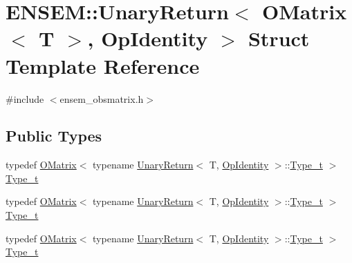 \hypertarget{structENSEM_1_1UnaryReturn_3_01OMatrix_3_01T_01_4_00_01OpIdentity_01_4}{}\section{E\+N\+S\+EM\+:\+:Unary\+Return$<$ O\+Matrix$<$ T $>$, Op\+Identity $>$ Struct Template Reference}
\label{structENSEM_1_1UnaryReturn_3_01OMatrix_3_01T_01_4_00_01OpIdentity_01_4}


{\ttfamily \#include $<$ensem\+\_\+obsmatrix.\+h$>$}

\subsection*{Public Types}
\begin{DoxyCompactItemize}
\item 
typedef \mbox{\hyperlink{classENSEM_1_1OMatrix}{O\+Matrix}}$<$ typename \mbox{\hyperlink{structENSEM_1_1UnaryReturn}{Unary\+Return}}$<$ T, \mbox{\hyperlink{structENSEM_1_1OpIdentity}{Op\+Identity}} $>$\+::\mbox{\hyperlink{structENSEM_1_1UnaryReturn_3_01OMatrix_3_01T_01_4_00_01OpIdentity_01_4_a7f4dcdf040c4857ee984e5fbf4813fc6}{Type\+\_\+t}} $>$ \mbox{\hyperlink{structENSEM_1_1UnaryReturn_3_01OMatrix_3_01T_01_4_00_01OpIdentity_01_4_a7f4dcdf040c4857ee984e5fbf4813fc6}{Type\+\_\+t}}
\item 
typedef \mbox{\hyperlink{classENSEM_1_1OMatrix}{O\+Matrix}}$<$ typename \mbox{\hyperlink{structENSEM_1_1UnaryReturn}{Unary\+Return}}$<$ T, \mbox{\hyperlink{structENSEM_1_1OpIdentity}{Op\+Identity}} $>$\+::\mbox{\hyperlink{structENSEM_1_1UnaryReturn_3_01OMatrix_3_01T_01_4_00_01OpIdentity_01_4_a7f4dcdf040c4857ee984e5fbf4813fc6}{Type\+\_\+t}} $>$ \mbox{\hyperlink{structENSEM_1_1UnaryReturn_3_01OMatrix_3_01T_01_4_00_01OpIdentity_01_4_a7f4dcdf040c4857ee984e5fbf4813fc6}{Type\+\_\+t}}
\item 
typedef \mbox{\hyperlink{classENSEM_1_1OMatrix}{O\+Matrix}}$<$ typename \mbox{\hyperlink{structENSEM_1_1UnaryReturn}{Unary\+Return}}$<$ T, \mbox{\hyperlink{structENSEM_1_1OpIdentity}{Op\+Identity}} $>$\+::\mbox{\hyperlink{structENSEM_1_1UnaryReturn_3_01OMatrix_3_01T_01_4_00_01OpIdentity_01_4_a7f4dcdf040c4857ee984e5fbf4813fc6}{Type\+\_\+t}} $>$ \mbox{\hyperlink{structENSEM_1_1UnaryReturn_3_01OMatrix_3_01T_01_4_00_01OpIdentity_01_4_a7f4dcdf040c4857ee984e5fbf4813fc6}{Type\+\_\+t}}
\end{DoxyCompactItemize}


